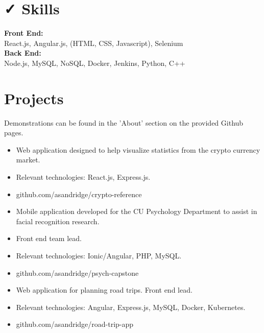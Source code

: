 \documentclass{resume}
\begin{document}
\section{{\faCheck} Skills}
\textbf{Front End:} \\
React.js, Angular.js, (HTML, CSS, Javascript), Selenium\\

\bigskip
\textbf{Back End:} \\
Node.js, MySQL, NoSQL, Docker, Jenkins, Python, C++\\

\section{{\faFolder} Projects}
Demonstrations can be found in the 'About' section on the provided Github pages. \\
\bigskip
{}
\begin{itemize}
  \item Web application designed to help visualize statistics from the crypto currency market.
  \item Relevant technologies: React.js, Express.js.
  \item github.com/asandridge/crypto-reference
\end{itemize}
\bigskip
{}
\begin{itemize}
  \item Mobile application developed for the CU Psychology Department to assist in facial recognition research.
  \item Front end team lead.
  \item Relevant technologies: Ionic/Angular, PHP, MySQL.
  \item github.com/asandridge/psych-capstone
\end{itemize}
\bigskip
{}
\begin{itemize}
  \item Web application for planning road trips. Front end lead.
  \item Relevant technologies: Angular, Express.js, MySQL, Docker, Kubernetes.
  \item github.com/asandridge/road-trip-app
\end{itemize}
\end{document}
